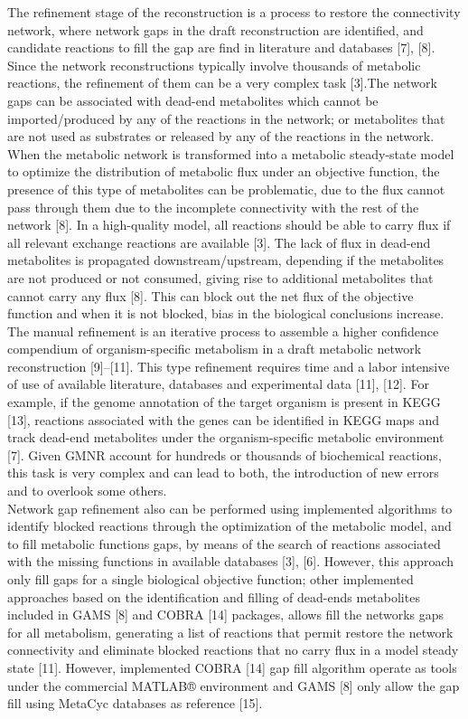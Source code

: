 The refinement stage of the reconstruction is a process to restore the connectivity network, where network gaps in the draft reconstruction are identified, and candidate reactions to fill the gap are find in literature and databases [7], [8]. Since the network reconstructions typically involve thousands of metabolic reactions, the refinement of them can be a very complex task [3].The network gaps can be associated with dead-end metabolites which cannot be imported/produced by any of the reactions in the network; or metabolites that are not used as substrates or released by any of the reactions in the network. When the metabolic network is transformed into a metabolic steady-state model to optimize the distribution of metabolic flux under an objective function, the presence of this type of metabolites can be problematic, due to the flux cannot pass through them due to the incomplete connectivity with the rest of the network [8].  In a high-quality model, all reactions should be able to carry flux if all relevant exchange reactions are available [3]. The lack of flux in dead-end metabolites is propagated downstream/upstream, depending if the metabolites are not produced or not consumed, giving rise to additional metabolites that cannot carry any flux [8]. This can block out the net flux of the objective function and when it is not blocked, bias in the biological conclusions increase. The manual refinement is an iterative process to assemble a higher confidence compendium of organism-specific metabolism in a draft metabolic network reconstruction [9]–[11]. This type refinement requires time and a labor intensive of use of available literature, databases and experimental data [11], [12]. For example, if the genome annotation of the target organism is present in KEGG [13], reactions associated with the genes can be identified in KEGG maps and track dead-end metabolites under the organism-specific metabolic environment [7]. Given GMNR account for hundreds or thousands of biochemical reactions, this task is very complex and can lead to both, the introduction of new errors and to overlook some others.\\

Network gap refinement also can be performed using implemented algorithms to identify blocked reactions through the optimization of the metabolic model, and to fill metabolic functions gaps, by means of the search of reactions associated with the missing functions in available databases [3], [6]. However, this approach only fill gaps for a single biological objective function; other implemented approaches based on the identification and filling of dead-ends metabolites included in GAMS [8] and COBRA [14] packages, allows fill the networks gaps for all metabolism, generating a list of reactions that permit restore the network connectivity and eliminate blocked reactions that no carry flux in a model steady state [11]. However, implemented COBRA [14] gap fill algorithm operate as tools under the commercial  MATLAB® environment and GAMS [8] only allow the gap fill using MetaCyc databases as reference [15].\\

